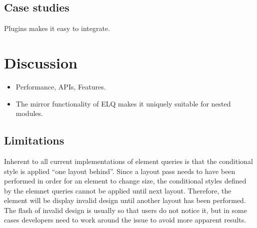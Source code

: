 \documentclass{acm_proc_article-sp}
\newcommand{\elq}{ELQ}
\newcommand{\gls}[1]{#1}
\begin{document}

  \subsection{Case studies}
    Plugins makes it easy to integrate.



\section{Discussion}
  \begin{itemize}
    \item Performance, APIs, Features.
    \item The mirror functionality of \elq{} makes it uniquely suitable for nested modules.
  \end{itemize}

  \subsection{Limitations}
    Inherent to all current implementations of element queries is that the conditional style is applied ``one layout behind''.
    Since a layout pass needs to have been performed in order for an element to change size, the conditional styles defined by the elemnet queries cannot be applied until next layout.
    Therefore, the element will be display invalid design until another layout has been performed.
    The flash of invalid design is usually so that users do not notice it, but in some cases developers need to work around the issue to avoid more apparent results.
\end{document}
